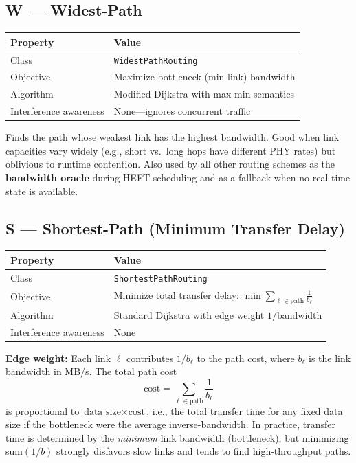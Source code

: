 \documentclass[11pt]{article}
\begin{document}
\subsection{W --- Widest-Path}

\begin{tabular}{@{}ll@{}}
\toprule
\textbf{Property} & \textbf{Value} \\
\midrule
Class        & \texttt{WidestPathRouting} \\
Objective    & Maximize bottleneck (min-link) bandwidth \\
Algorithm    & Modified Dijkstra with max-min semantics \\
Interference awareness & None---ignores concurrent traffic \\
\bottomrule
\end{tabular}

\medskip
Finds the path whose weakest link has the highest bandwidth.  Good when link
capacities vary widely (e.g., short vs.\ long hops have different PHY rates)
but oblivious to runtime contention.  Also used by all other routing schemes
as the \textbf{bandwidth oracle} during HEFT scheduling and as a fallback
when no real-time state is available.

\subsection{S --- Shortest-Path (Minimum Transfer Delay)}

\begin{tabular}{@{}ll@{}}
\toprule
\textbf{Property} & \textbf{Value} \\
\midrule
Class        & \texttt{ShortestPathRouting} \\
Objective    & Minimize total transfer delay: $\min \sum_{\ell \in \text{path}} \frac{1}{b_\ell}$ \\
Algorithm    & Standard Dijkstra with edge weight $1/\text{bandwidth}$ \\
Interference awareness & None \\
\bottomrule
\end{tabular}

\medskip
\textbf{Edge weight:} Each link $\ell$ contributes $1 / b_\ell$ to the path
cost, where $b_\ell$ is the link bandwidth in MB/s.  The total path cost
\[
  \text{cost} = \sum_{\ell \in \text{path}} \frac{1}{b_\ell}
\]
is proportional to $\text{data\_size} \times \text{cost}$, i.e., the total
transfer time for any fixed data size if the bottleneck were the average
inverse-bandwidth.  In practice, transfer time is determined by the
\emph{minimum} link bandwidth (bottleneck), but minimizing sum$(1/b)$
strongly disfavors slow links and tends to find high-throughput paths.
\end{document}
